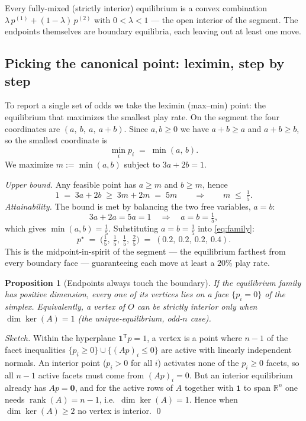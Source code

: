 \documentclass[11pt]{article}
\newcommand{\R}{\mathbb{R}}
\newcommand{\ones}{\mathbf{1}}
\newcommand{\zero}{\mathbf{0}}
\DeclareMathOperator{\rank}{rank}
\theoremstyle{plain}
\newtheorem{proposition}{Proposition}
\theoremstyle{definition}
\begin{document}
Every fully-mixed (strictly interior) equilibrium is a convex combination
$\lambda\,p^{(1)} + (1-\lambda)\,p^{(2)}$ with $0<\lambda<1$ --- the open interior of
the segment. The endpoints themselves are boundary equilibria, each leaving out at
least one move.

\subsection{Picking the canonical point: leximin, step by step}

To report a single set of odds we take the leximin (max--min) point: the equilibrium
that maximizes the smallest play rate. On the segment the four coordinates are
$(a,\ b,\ a,\ a+b)$. Since $a,b\ge0$ we have $a+b\ge a$ and $a+b\ge b$, so the
smallest coordinate is
\[
  \min_i p_i \;=\; \min(a,\,b).
\]
We maximize $m:=\min(a,b)$ subject to $3a+2b=1$.

\emph{Upper bound.} Any feasible point has $a\ge m$ and $b\ge m$, hence
\[
  1 \;=\; 3a+2b \;\ge\; 3m+2m \;=\; 5m
  \qquad\Longrightarrow\qquad m \;\le\; \tfrac15 .
\]
\emph{Attainability.} The bound is met by balancing the two free variables, $a=b$:
\[
  3a+2a = 5a = 1 \quad\Longrightarrow\quad a=b=\tfrac15,
\]
which gives $\min(a,b)=\tfrac15$. Substituting $a=b=\tfrac15$ into
\eqref{eq:family}:
\[
  p^\star \;=\; \bigl(\tfrac15,\ \tfrac15,\ \tfrac15,\ \tfrac25\bigr)
          \;=\; (0.2,\ 0.2,\ 0.2,\ 0.4).
\]
This is the midpoint-in-spirit of the segment --- the equilibrium farthest from every
boundary face --- guaranteeing each move at least a $20\%$ play rate.

\begin{proposition}[Endpoints always touch the boundary]
If the equilibrium family has positive dimension, every one of its vertices lies on a
face $\{p_i=0\}$ of the simplex. Equivalently, a vertex of $O$ can be strictly
interior only when $\dim\ker(A)=1$ (the unique-equilibrium, odd-$n$ case).
\end{proposition}

\begin{proof}[Sketch]
Within the hyperplane $\ones^{\mathsf T}p=1$, a vertex is a point where $n-1$ of the
facet inequalities $\{p_i\ge0\}\cup\{(Ap)_i\le0\}$ are active with linearly
independent normals. An interior point ($p_i>0$ for all $i$) activates none of the
$p_i\ge0$ facets, so all $n-1$ active facets must come from $(Ap)_i=0$. But an
interior equilibrium already has $Ap=\zero$, and for the active rows of $A$ together
with $\ones$ to span $\R^n$ one needs $\rank(A)=n-1$, i.e.\ $\dim\ker(A)=1$. Hence
when $\dim\ker(A)\ge 2$ no vertex is interior. \qed
\end{proof}
\end{document}
